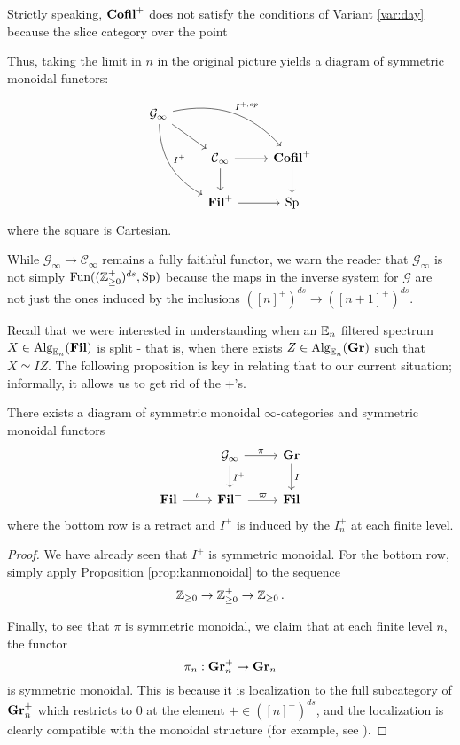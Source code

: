 \begin{rmk}
Strictly speaking, $\operatorname{\textbf{Cofil}}^+$ does not satisfy the conditions of Variant \ref{var:day} because the slice category over the point
\end{rmk}

Thus, taking the limit in $n$ in the original picture yields a diagram of symmetric monoidal functors:

$$
\begin{tikzcd}
\mathcal{G}_\infty
 \arrow[drr, bend left, "I^{+,op}"]
  \arrow[ddr, bend right, "I^+"]
  \arrow[dr] & & \\
&\C_\infty \arrow[r] \arrow[d]&  \Cofil^+ \arrow[d]\\
& \Fil^+ \arrow[r]& \Sp
\end{tikzcd}
$$
where the square is Cartesian.

\begin{rmk}
While $\mathcal{G}_\infty \to \mathcal{C}_\infty$ remains a fully faithful functor, we warn the reader that $\mathcal{G}_\infty$ is not simply $\operatorname{\text{Fun}}((\operatorname{\mathbb{Z}}_{\geq 0}^+)^{ds}, \operatorname{\text{Sp}})$ because the maps in the inverse system for $\mathcal{G}$ are not just the ones induced by the inclusions $([n]^+)^{ds} \to ([n+1]^+)^{ds}.$
\end{rmk}


Recall that we were interested in understanding when an $\operatorname{\mathbb{E}}_n$ filtered spectrum $X\in \operatorname{\text{Alg}}_{\operatorname{\mathbb{E}}_n}(\operatorname{\textbf{Fil}})$ is split - that is, when there exists $Z\in \operatorname{\text{Alg}}_{\operatorname{\mathbb{E}}_n}(\operatorname{\textbf{Gr}})$ such that $X \simeq IZ.$  The following proposition is key in relating that to our current situation; informally, it allows us to get rid of the +'s.

\begin{prop}\label{prop:MonRet}
There exists a diagram of symmetric monoidal $\infty$-categories and symmetric monoidal functors 
$$
\begin{tikzcd}
&\mathcal{G}_\infty \arrow[r,"\pi"] \arrow[d, "I^+"]&  \Gr \arrow[d, "I"]\\
\Fil \arrow[r,"\iota"] & \Fil^+ \arrow[r,"\varpi"]& \Fil
\end{tikzcd}
$$
where the bottom row is a retract and $I^+$ is induced by the $I_n^+$ at each finite level.  
\end{prop} 
\begin{proof}
We have already seen that $I^+$ is symmetric monoidal.  For the bottom row, simply apply Proposition \ref{prop:kanmonoidal} to the sequence $$\operatorname{\mathbb{Z}}_{\geq 0} \to \operatorname{\mathbb{Z}}_{\geq 0}^+ \to \operatorname{\mathbb{Z}}_{\geq 0}.$$

Finally, to see that $\pi$ is symmetric monoidal, we claim that at each finite level $n$, the functor $$\pi_n: \operatorname{\textbf{Gr}}_n^+ \to \operatorname{\textbf{Gr}}_n$$ is symmetric monoidal.  This is because it is localization to the full subcategory of $\operatorname{\textbf{Gr}}_n^+$ which restricts to $0$ at the element $+\in ([n]^+)^{ds}$, and the localization is clearly compatible with the monoidal structure (for example, see \cite[Proposition 2.2.1.9]{HA}).%



\end{proof}



